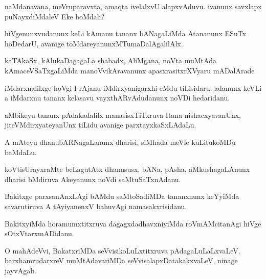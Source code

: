 \documentclass{article}
\begin{document}
\begin{mn}%
naMdanavana, meVruparavxta, amaqta ivelalxvU alapxvAduvu. ivanunx savxlapx puNayxdiMdaleV 
Eke hoMdali?
\end{mn}

\begin{mn}%
hiVgenunxvudanunx keLi kAmanu tananx bANagaLiMda Atananunx ESuTx hoDedarU, avanige 
toMdareyanunxMTumaDalAgalilAlx.
\end{mn}

\begin{mn}%
kaTAkaSx, kAlukaDagagaLa shabadx, AliMgana, noVta muMtAda kAmaceVSaTxgaLiMda 
manoVvikAravanunx apasxrasitxrXVyaru mADalArade
\end{mn}

\begin{mn}%
iMdarxnalilxge hoVgi I rAjanu iMdirxyanigarxhi eMdu tiLisidaru. adanunx keVLi a iMdarxnu
tananx kelasavu vayxthARvAdudanunx noVDi hedaridanu.
\end{mn}

\begin{mn}%
aMbikeyu tananx pAdakadalilx manasisxTiTxruva Itana nishacxyavanUnx, jiteVMdirxyateyanUnx 
tiLidu avanige parxtayxkaSxLAdaLu.
\end{mn}

\begin{mn}%
A mAteyu dhanubARNagaLanunx dharisi, siMhada meVle kuLitukoMDu baMdaLu.
\end{mn}

\begin{mn}%
koVtisUrayxraMte beLagutAtx dhanususx, bANa, pAsha, aMkushagaLAnunx dharisi bMdiruva 
Akeyanunx noVdi saMtuSaTxnAdanu.
\end{mn}

\begin{mn}%
Bakitxge parxsanAnxLAgi bAMdu saMtoSadiMDa tananxnunx keYyiMda savarutiruva A tAyiyanenxV 
bahuvAgi namasakxrisidanu.
\end{mn}

\begin{mn}%
BakitxyiMda horamumxtitxruva dagagxdadhavxniyiMda roVmAMcitanAgi hiVge sOtxVtarxmADidanu.
\end{mn}

\begin{mn}%
O mahAdeVvi, BakatxriMDa seVvisikoLuLxtitxruva pAdagaLuLaLxvaLeV. barxhamrudarxreV 
muMtAdavariMDa seVvisalapxDatakakxvaLeV, ninage jayvAgali.
\end{mn}
\end{document}
